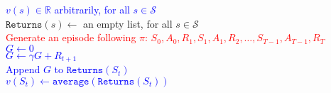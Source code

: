 \documentclass{standalone}
\begin{document}
\pagestyle{empty}
\begin{algorithm}[H]
  \textcolor{blue}{$v(s) \in \mathbb R$ arbitrarily, for all $s \in \mathcal S$ \\}
  $\texttt{Returns}(s) \gets$ an empty list, for all $s \in \mathcal S$ \\
   {
    \textcolor{red}{Generate an episode following $\pi$: $S_0, A_0, R_1, S_1, A_1, R_2,     \ldots,S_{T-1}, A_{T-1}, R_T$ \\}
    \textcolor{blue}{$G\gets 0$ \\}
     {
      \textcolor{blue}{$G \gets \gamma G + R_{t+1}$ \\
       {
        Append $G$ to $\texttt{Returns}(S_t)$ \\
        $v(S_t) \gets \texttt{average}(\texttt{Returns}(S_t))$
      }}
    }
  }
\end{algorithm}
\end{document}
